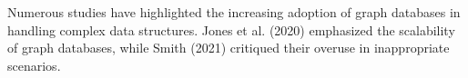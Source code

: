 Numerous studies have highlighted the increasing adoption of graph databases in handling complex data structures. Jones et al. (2020) emphasized the scalability of graph databases, while Smith (2021) critiqued their overuse in inappropriate scenarios.
